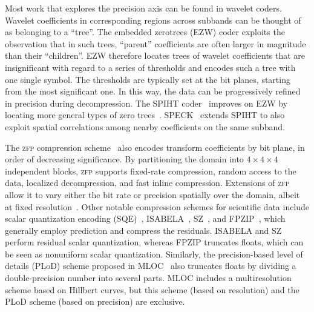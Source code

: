 Most work that explores the precision axis can be found in wavelet coders. Wavelet coefficients in
corresponding regions across subbands can be thought of as belonging to a ``tree''. The embedded
zerotrees (EZW) coder exploits the observation that in such trees, ``parent'' coefficients are often
larger in magnitude than their ``children''. EZW therefore locates trees of wavelet coefficients
that are insignificant with regard to a series of thresholds and encodes such a tree with one single
symbol. The thresholds are typically set at the bit planes, starting from the most significant one.
In this way, the data can be progressively refined in precision during decompression. The SPIHT
coder~\cite{spiht1996} improves on EZW by locating more general types of zero
trees~\cite{quantifying-coding-performance}. SPECK~\cite{speck2004} extends SPIHT to also exploit
spatial correlations among nearby coefficients on the same subband.

\newcommand{\zfp}{\textsc{zfp}\xspace}
The \zfp compression scheme~\cite{zfp2014} also encodes transform coefficients by bit plane, in
order of decreasing significance. By partitioning the domain into $4 \times 4 \times 4$ independent
blocks, \zfp supports fixed-rate compression, random access to the data, localized decompression,
and fast inline compression. Extensions of \zfp allow it to vary either the bit rate or precision
spatially over the domain, albeit at fixed resolution~\cite{zfp-arc}. Other notable compression
schemes for scientific data include scalar quantization encoding (SQE)~\cite{sqe},
ISABELA~\cite{isabela}, SZ~\cite{sz}, and FPZIP~\cite{fpzip}, which generally employ prediction and
compress the residuals. ISABELA and SZ perform residual scalar quantization, whereas FPZIP truncates
floats, which can be seen as nonuniform scalar quantization. Similarly, the precision-based level of
details (PLoD) scheme proposed in MLOC~\cite{mloc} also truncates floats by dividing a
double-precision number into several parts. MLOC includes a multiresolution scheme based on Hillbert
curves, but this scheme (based on resolution) and the PLoD scheme (based on precision) are
exclusive.

